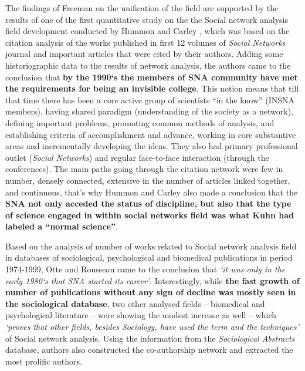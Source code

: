 \documentclass[11pt]{article} %
\begin{document}
The findings of Freeman on the unification of the field are supported by the results of one of the first quantitative study on the the Social network analysis field development conducted by Hummon and Carley \citep{normSci}, which was based on the citation analysis of the works published in first 12 volumes of  \textit{Social Networks} journal and important articles that were cited by their authors. Adding some historiographic data to the results of  network analysis, the authors came to the conclusion that \textbf{by the 1990`s the members of SNA community have met the requirements for being an invisible college}. This notion means that till that time there has been a core active group of scientists “in the know” (INSNA members), having shared paradigm (understanding of the society as a network), defining important problems, promoting common methods of analysis, and establishing criteria of accomplishment and advance, working in core substantive areas and incrementally developing the ideas. They also had primary professional outlet (\textit{Social Networks}) and regular face-to-face interaction (through the conferences). The main paths going through the citation network were few in number, densely connected, extensive in the number of articles linked together, and continuous, that’s why Hummon and Carley also made a conclusion that the \textbf{SNA not only acceded the status of discipline, but also that the type of science engaged in within social networks field was what Kuhn had labeled a “normal science”}.\medskip 

Based on the analysis of number of works related to Social network analysis field in databases of sociological, psychological and biomedical publications in period 1974-1999, Otte and Rousseau \citep{SNAinf} came to the conclusion that \textit{`it was only in the early 1980`s that SNA started its career'}. Interestingly, while \textbf{the fast growth of number of publications without any sign of decline was mostly seen in the sociological database}, two other analysed fields -- biomedical and psychological literature -- were showing the modest increase as well -- which \textit{`proves that other fields, besides Sociology, have used the term and the techniques'} of Social network analysis. Using the information from the \textit{Sociological Abstracts} database, authors also constructed the co-authorship network and extracted the most prolific authors.\medskip 
\end{document}
